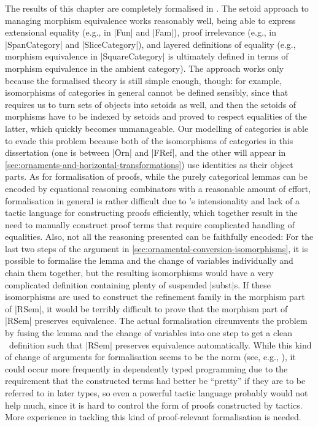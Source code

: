 The results of this chapter are completely formalised in \Agda.
The setoid approach to managing morphism equivalence works reasonably well, being able to express extensional equality (e.g., in |Fun| and |Fam|), proof irrelevance (e.g., in |SpanCategory| and |SliceCategory|), and layered definitions of equality (e.g., morphism equivalence in |SquareCategory| is ultimately defined in terms of morphism equivalence in the ambient category).
The approach works only because the formalised theory is still simple enough, though: for example, isomorphisms of categories in general cannot be defined sensibly, since that requires us to turn sets of objects into setoids as well, and then the setoids of morphisms have to be indexed by setoids and proved to respect equalities of the latter, which quickly becomes unmanageable.
Our modelling of categories is able to evade this problem because both of the isomorphisms of categories in this dissertation (one is between |Ōrn| and |FRef|, and the other will appear in \autoref{sec:ornaments-and-horizontal-transformations}) use identities as their object parts.
As for formalisation of proofs, while the purely categorical lemmas can be encoded by equational reasoning combinators with a reasonable amount of effort, formalisation in general is rather difficult due to \Agda's intensionality and lack of a tactic language for constructing proofs efficiently, which together result in the need to manually construct proof terms that require complicated handling of equalities.
Also, not all the reasoning presented can be faithfully encoded: For the last two steps of the argument in \autoref{sec:ornamental-conversion-isomorphisms}, it is possible to formalise the lemma and the change of variables individually and chain them together, but the resulting isomorphisms would have a very complicated definition containing plenty of suspended |subst|s.
If these isomorphisms are used to construct the refinement family in the morphism part of |RSem|, it would be terribly difficult to prove that the morphism part of |RSem| preserves equivalence.
The actual formalisation circumvents the problem by fusing the lemma and the change of variables into one step to get a clean \Agda\ definition such that |RSem| preserves equivalence automatically.
While this kind of change of arguments for formalisation seems to be the norm (see, e.g., \citet[Section~4.5]{Avigad-prime-number-theorem}), it could occur more frequently in dependently typed programming due to the requirement that the constructed terms had better be ``pretty'' if they are to be referred to in later types, so even a powerful tactic language probably would not help much, since it is hard to control the form of proofs constructed by tactics.
More experience in tackling this kind of proof-relevant formalisation is needed.
